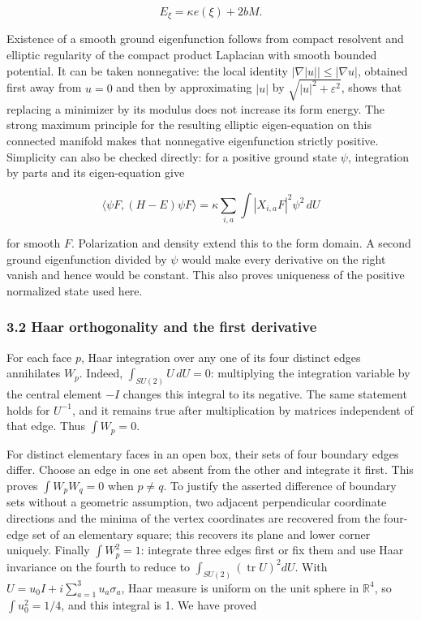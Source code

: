 \[
E_\xi=\kappa e(\xi)+2bM.
\tag{3.4}
\]

Existence of a smooth ground eigenfunction follows from compact
resolvent and elliptic regularity of the compact product Laplacian with
smooth bounded potential. It can be taken nonnegative: the local
identity \(|\nabla|u||\leq|\nabla u|\), obtained first away from \(u=0\)
and then by approximating \(|u|\) by \(\sqrt{|u|^2+\varepsilon^2}\),
shows that replacing a minimizer by its modulus does not increase its
form energy. The strong maximum principle for the resulting elliptic
eigen-equation on this connected manifold makes that nonnegative
eigenfunction strictly positive. Simplicity can also be checked
directly: for a positive ground state \(\psi\), integration by parts and
its eigen-equation give

\[
\langle\psi F,(H-E)\psi F\rangle
=\kappa\sum_{i,a}\int |X_{i,a}F|^2\psi^2\,dU
\tag{3.5}
\]

for smooth \(F\). Polarization and density extend this to the form
domain. A second ground eigenfunction divided by \(\psi\) would make
every derivative on the right vanish and hence would be constant. This
also proves uniqueness of the positive normalized state used here.

\subsubsection{3.2 Haar orthogonality and the first
derivative}\label{bulk-haar-orthogonality-and-the-first-derivative}

For each face \(p\), Haar integration over any one of its four distinct
edges annihilates \(W_p\). Indeed, \(\int_{SU(2)}U\,dU=0\): multiplying
the integration variable by the central element \(-I\) changes this
integral to its negative. The same statement holds for \(U^{-1}\), and
it remains true after multiplication by matrices independent of that
edge. Thus \(\int W_p=0\).

For distinct elementary faces in an open box, their sets of four
boundary edges differ. Choose an edge in one set absent from the other
and integrate it first. This proves \(\int W_pW_q=0\) when \(p\ne q\).
To justify the asserted difference of boundary sets without a geometric
assumption, two adjacent perpendicular coordinate directions and the
minima of the vertex coordinates are recovered from the four-edge set of
an elementary square; this recovers its plane and lower corner uniquely.
Finally \(\int W_p^2=1\): integrate three edges first or fix them and
use Haar invariance on the fourth to reduce to
\(\int_{SU(2)}(\operatorname{tr}U)^2dU\). With
\(U=u_0I+i\sum_{a=1}^3u_a\sigma_a\), Haar measure is uniform on the unit
sphere in \(\mathbb R^4\), so \(\int u_0^2=1/4\), and this integral is
1. We have proved

